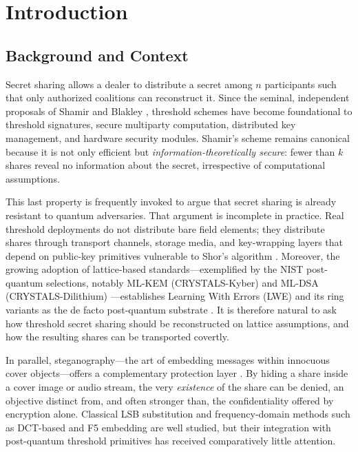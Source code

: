 \documentclass[preprint,12pt,number]{elsarticle}
\begin{document}
\section{Introduction}
\label{sec:intro}

\subsection{Background and Context}

Secret sharing allows a dealer to distribute a secret among $n$ participants
such that only authorized coalitions can reconstruct it. Since the seminal,
independent proposals of Shamir \citep{shamir1979} and Blakley
\citep{blakley1979}, threshold schemes have become foundational to threshold
signatures, secure multiparty computation, distributed key management, and
hardware security modules. Shamir's scheme remains canonical because it is not
only efficient but \emph{information-theoretically secure}: fewer than $k$
shares reveal no information about the secret, irrespective of computational
assumptions.

This last property is frequently invoked to argue that secret sharing is
already resistant to quantum adversaries. That argument is incomplete in
practice. Real threshold deployments do not distribute bare field elements;
they distribute shares through transport channels, storage media, and
key-wrapping layers that depend on public-key primitives vulnerable to Shor's
algorithm \citep{shor1994}. Moreover, the growing adoption of lattice-based
standards---exemplified by the NIST post-quantum selections, notably ML-KEM
(CRYSTALS-Kyber) and ML-DSA (CRYSTALS-Dilithium) \citep{nist2024,avanzi2020,ducas2018}---establishes
Learning With Errors (LWE) and its ring variants as the de facto post-quantum
substrate \citep{regev2005,peikert2009,micciancio2009}. It is therefore natural
to ask how threshold secret sharing should be reconstructed on lattice
assumptions, and how the resulting shares can be transported covertly.

In parallel, steganography---the art of embedding messages within innocuous
cover objects---offers a complementary protection layer
\citep{simmons1984,cachin1998,provos2003,fridrich2009}. By hiding a share
inside a cover image or audio stream, the very \emph{existence} of the share
can be denied, an objective distinct from, and often stronger than, the
confidentiality offered by encryption alone. Classical LSB substitution
\citep{bender1996,chan2004} and frequency-domain methods such as DCT-based and
F5 embedding \citep{westfeld2001} are well studied, but their integration with
post-quantum threshold primitives has received comparatively little attention.
\end{document}
